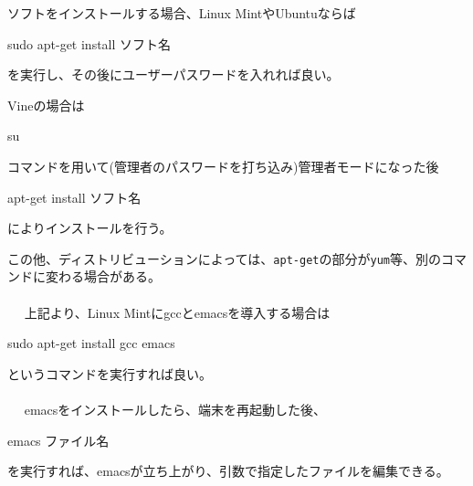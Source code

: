 ソフトをインストールする場合、Linux MintやUbuntuならば
\begin{code}
sudo apt-get install ソフト名
\end{code}
を実行し、その後にユーザーパスワードを入れれば良い。

Vineの場合は
\begin{code}
su
\end{code}
コマンドを用いて(管理者のパスワードを打ち込み)管理者モードになった後
\begin{code}
apt-get install ソフト名
\end{code}
によりインストールを行う。

この他、ディストリビューションによっては、\verb|apt-get|の部分が\verb|yum|等、別のコマンドに変わる場合がある。
\\ \\　
上記より、Linux Mintにgccとemacsを導入する場合は
\begin{code}
sudo apt-get install gcc emacs
\end{code}
というコマンドを実行すれば良い。
\\ \\　
emacsをインストールしたら、端末を再起動した後、
\begin{code}
emacs ファイル名
\end{code}
を実行すれば、emacsが立ち上がり、引数で指定したファイルを編集できる。
\newpage

